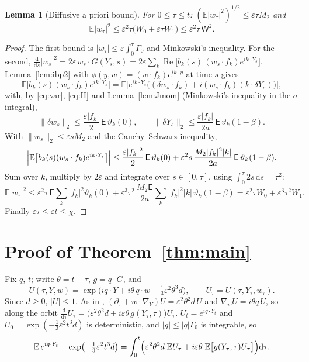 \documentclass[11pt]{article}
\newcommand{\dd}{\mathrm{d}}
\newcommand{\E}{\mathbb{E}}
\newcommand{\eps}{\varepsilon}
\newcommand{\sE}{\mathsf{E}}
\newcommand{\sW}{\mathsf{W}}
\renewcommand{\Re}{\operatorname{Re}}
\newcommand{\nrm}[2]{\|#1\|_{#2}}
\newtheorem{lemma}[theorem]{Lemma}
\theoremstyle{remark}
\begin{document}
\begin{lemma}[Diffusive a priori bound]\label{lem:w}
For $0\le\tau\le t$: $(\E|w_\tau|^2)^{1/2}\le\eps\tau M_2$ and
\[
  \E|w_\tau|^2\le\eps^2\tau\bigl(W_0+\eps\tau W_1\bigr)\le\eps^2\tau\,\sW^2 .
\]
\end{lemma}

\begin{proof}
The first bound is $|w_\tau|\le\eps\int_0^\tau\Gamma_0$ and Minkowski's
inequality. For the second,
$\frac{\dd}{\dd s}|w_s|^2 = 2\eps\,w_s\cdot G(Y_s,s)
= 2\eps\sum_k\Re\bigl[b_k(s)\,(w_s\cdot f_k)e^{ik\cdot Y_s}\bigr]$.
Lemma~\ref{lem:ibp2} with $\phi(y,w) = (w\cdot f_k)e^{ik\cdot y}$ at time
$s$ gives
\[
  \E\bigl[b_k(s)(w_s\cdot f_k)e^{ik\cdot Y_s}\bigr]
  = \E\bigl[e^{ik\cdot Y_s}\bigl((\delta w_s\cdot f_k)
     + i(w_s\cdot f_k)(k\cdot\delta Y_s)\bigr)\bigr],
\]
with, by \eqref{eq:var}, \eqref{eq:H} and Lemma~\ref{lem:Jmom}
(Minkowski's inequality in the $\sigma$ integral),
\[
  \nrm{\delta w_s}{2}\le\frac{\eps|f_k|}{2}\,\sE\,\vartheta_k(0),
  \qquad
  \nrm{\delta Y_s}{2}\le\frac{\eps|f_k|}{2a}\,\sE\,\vartheta_k(1-\beta).
\]
With $\nrm{w_s}{2}\le\eps sM_2$ and the Cauchy--Schwarz inequality,
\[
  \Bigl|\E\bigl[b_k(s)(w_s\cdot f_k)e^{ik\cdot Y_s}\bigr]\Bigr|
  \le\frac{\eps|f_k|^2}{2}\,\sE\,\vartheta_k(0)
   + \eps^2s\,\frac{M_2|f_k|^2|k|}{2a}\,\sE\,\vartheta_k(1-\beta).
\]
Sum over $k$, multiply by $2\eps$ and integrate over $s\in[0,\tau]$, using
$\int_0^\tau2s\,\dd s = \tau^2$:
\[
  \E|w_\tau|^2\le\eps^2\tau\,\sE\sum_k|f_k|^2\vartheta_k(0)
   + \eps^3\tau^2\,\frac{M_2\sE}{2a}\sum_k|f_k|^2|k|\,\vartheta_k(1-\beta)
  = \eps^2\tau W_0+\eps^3\tau^2W_1 .
\]
Finally $\eps\tau\le\eps t\le\chi$.
\end{proof}

\section{Proof of Theorem~\ref{thm:main}}

Fix $q$, $t$; write $\theta = t-\tau$, $g = q\cdot G$, and
\[
  U(\tau,Y,w) = \exp\bigl(iq\cdot Y+i\theta\,q\cdot w-\tfrac13\eps^2\theta^3d\bigr),
  \qquad U_\tau = U(\tau,Y_\tau,w_\tau).
\]
Since $d\ge0$, $|U|\le1$. As in \cite{Note},
$(\partial_\tau+w\cdot\nabla_Y)U = \eps^2\theta^2d\,U$ and
$\nabla_wU = i\theta q\,U$, so along the orbit
$\frac{\dd}{\dd\tau}U_\tau = \bigl(\eps^2\theta^2d+i\eps\theta\,g(Y_\tau,\tau)\bigr)U_\tau$.
$U_t = e^{iq\cdot Y_t}$ and $U_0 = \exp(-\frac13\eps^2t^3d)$ is
deterministic, and $|g|\le|q|\Gamma_0$ is integrable, so
\begin{equation}
  \E\,e^{iq\cdot Y_t}-\exp\bigl(-\tfrac13\eps^2t^3d\bigr)
  = \int_0^t\Bigl(\eps^2\theta^2d\;\E U_\tau
     + i\eps\theta\;\E\bigl[g(Y_\tau,\tau)U_\tau\bigr]\Bigr)\dd\tau .
  \label{eq:start}
\end{equation}
\end{document}
